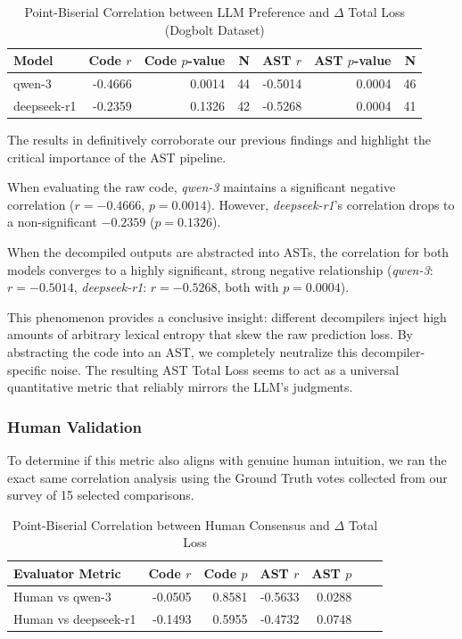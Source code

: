 \begin{table}[H]
\centering
\caption{Point-Biserial Correlation between LLM Preference and $\Delta$ Total Loss (Dogbolt Dataset)}\label{tab:loss_dogbolt_correlation}
\begin{tabular}{lrrrrrr}
\toprule
\textbf{Model} & \textbf{Code $r$} & \textbf{Code $p$-value} & \textbf{N} & \textbf{AST $r$} & \textbf{AST $p$-value} & \textbf{N} \\
\midrule
qwen-3 & -0.4666 & 0.0014 & 44 & -0.5014 & 0.0004 & 46 \\
deepseek-r1 & -0.2359 & 0.1326 & 42 & -0.5268 & 0.0004 & 41 \\
\bottomrule
\end{tabular}
\end{table}

The results in  definitively corroborate our previous findings and highlight the critical importance of the \ac{AST} pipeline. 

When evaluating the raw code, \emph{qwen-3} maintains a significant negative correlation ($r = -0.4666$, $p = 0.0014$). However, \emph{deepseek-r1}'s correlation drops to a non-significant $-0.2359$ ($p = 0.1326$). 

When the decompiled outputs are abstracted into \ac{AST}s, the correlation for both models converges to a highly significant, strong negative relationship (\emph{qwen-3}: $r = -0.5014$, \emph{deepseek-r1}: $r = -0.5268$, both with $p = 0.0004$). 

This phenomenon provides a conclusive insight: different decompilers inject high amounts of arbitrary lexical entropy that skew the raw prediction loss. By abstracting the code into an \ac{AST}, we completely neutralize this decompiler-specific noise. The resulting \ac{AST} Total Loss seems to act as a universal quantitative metric that reliably mirrors the \ac{LLM}'s judgments.

\subsubsection{Human Validation}

To determine if this metric also aligns with genuine human intuition, we ran the exact same correlation analysis using the Ground Truth votes collected from our survey of 15 selected comparisons.

\begin{table}[H]
\centering
\caption{Point-Biserial Correlation between Human Consensus and $\Delta$ Total Loss}\label{tab:loss_human_correlation}
\begin{tabular}{lrrrrrr}
\toprule
\textbf{Evaluator Metric} & \textbf{Code $r$} & \textbf{Code $p$} & \textbf{AST $r$} & \textbf{AST $p$} \\
\midrule
Human vs qwen-3 & -0.0505 & 0.8581 & -0.5633 & 0.0288 \\
Human vs deepseek-r1 & -0.1493 & 0.5955 & -0.4732 & 0.0748 \\
\bottomrule
\end{tabular}
\end{table}

